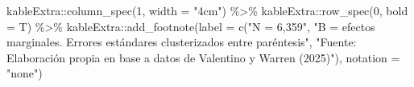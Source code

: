 \documentclass[
  13pt,
  a4paper,
]{article}
\newenvironment{Shaded}{\begin{snugshade}}{\end{snugshade}}
\newcommand{\AttributeTok}[1]{\textcolor[rgb]{0.77,0.63,0.00}{#1}}
\newcommand{\DecValTok}[1]{\textcolor[rgb]{0.00,0.00,0.81}{#1}}
\newcommand{\FunctionTok}[1]{\textcolor[rgb]{0.00,0.00,0.00}{#1}}
\newcommand{\NormalTok}[1]{#1}
\newcommand{\SpecialCharTok}[1]{\textcolor[rgb]{0.00,0.00,0.00}{#1}}
\newcommand{\StringTok}[1]{\textcolor[rgb]{0.31,0.60,0.02}{#1}}
\begin{document}
\begin{Shaded}
\begin{Highlighting}[]
\NormalTok{  kableExtra}\SpecialCharTok{::}\FunctionTok{column\_spec}\NormalTok{(}\DecValTok{1}\NormalTok{, }\AttributeTok{width =} \StringTok{"4cm"}\NormalTok{) }\SpecialCharTok{\%\textgreater{}\%}
\NormalTok{  kableExtra}\SpecialCharTok{::}\FunctionTok{row\_spec}\NormalTok{(}\DecValTok{0}\NormalTok{, }\AttributeTok{bold =}\NormalTok{ T) }\SpecialCharTok{\%\textgreater{}\%} 
\NormalTok{  kableExtra}\SpecialCharTok{::}\FunctionTok{add\_footnote}\NormalTok{(}\AttributeTok{label =} \FunctionTok{c}\NormalTok{(}\StringTok{"N = 6,359"}\NormalTok{, }\StringTok{"B = efectos marginales. Errores estándares clusterizados entre paréntesis"}\NormalTok{, }\StringTok{"Fuente: Elaboración propia en base a datos de Valentino y Warren (2025)"}\NormalTok{), }\AttributeTok{notation =} \StringTok{"none"}\NormalTok{)}
\end{Highlighting}
\end{Shaded}
\end{document}
